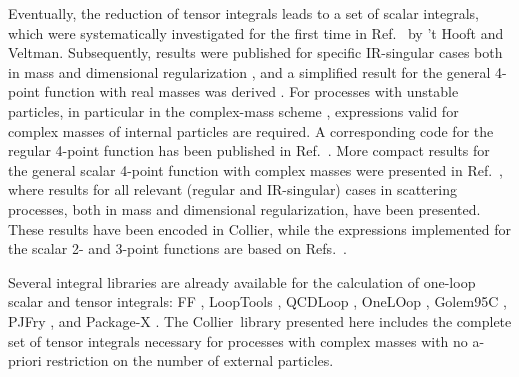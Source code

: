 \documentclass[preprint,sort&compress,12pt]{elsarticle}
\def\citere#1{\mbox{Ref.~\cite{#1}}}
\def\citeres#1{\mbox{Refs.~\cite{#1}}}
\newcommand{\collier}{{\sc Collier}}
\begin{document}
Eventually, the reduction of tensor integrals leads to a set of scalar
integrals, which were systematically investigated for the first time
in \citere{'tHooft:1978xw} by 't Hooft and Veltman.
Subsequently, results were published for
specific IR-singular cases both in mass and dimensional regularization
\cite{Bern:1992em,Beenakker:1988jr,Bern:1993kr}, and a simplified
result for the general 4-point function with real masses was derived
\cite{Denner:1991qq}. For processes with unstable particles, in
particular in the complex-mass scheme
\cite{Denner:1999gp,Denner:2005fg}, expressions valid for complex masses of internal
particles are required. A corresponding code for the regular
4-point function has
been published in \citere{Nhung:2009pm}.  More compact results for
the general scalar 4-point function with complex masses were presented in
\citere{Denner:2010tr}, where results for all relevant 
(regular and IR-singular) cases in
scattering processes, both in mass and dimensional regularization, have been presented. These results have been
encoded in \collier, while the expressions implemented for the scalar 2- and
3-point functions are based on
\citeres{Dittmaier:2003bc,'tHooft:1978xw}.

Several integral libraries are already available 
for the calculation of one-loop scalar and tensor integrals: {\sc FF} \cite{vanOldenborgh:1990yc}, {\sc
  LoopTools} \cite{Hahn:1998yk}, {\sc QCDLoop} \cite{Ellis:2007qk},
  {\sc OneLOop} \cite{vanHameren:2010cp}, {\sc Golem95C}
\cite{Cullen:2011kv},
{\sc PJFry} \cite{Fleischer:2010sq}, and {\sc Package-X} \cite{Patel:2015tea}. The \collier\ library presented here 
  includes the complete set of tensor integrals necessary for
  processes with complex masses 
with no a-priori restriction on the number of external particles.
\end{document}
